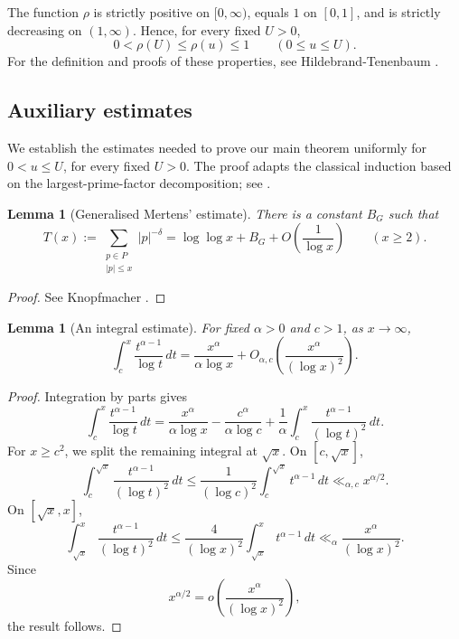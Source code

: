 \documentclass[a4paper]{amsart}
\newtheorem{lemma}[theorem]{Lemma}
\begin{document}
The function $\rho$ is strictly positive on $[0,\infty)$,
equals $1$ on $[0,1]$, and is strictly decreasing on
$(1,\infty)$. Hence, for every fixed $U>0$,
\[0<\rho(U)\le\rho(u)\le1
\qquad(0\le u\le U).\]
For the definition and proofs of these properties, see
Hildebrand-Tenenbaum
\cite[equations (1.5)-(1.6), p. 414,
and Lemma 2.5, p. 426]{hildebrand1993integers}.


\subsection{Auxiliary estimates}

We establish the estimates needed to prove our main theorem
uniformly for $0<u\le U$, for every fixed $U>0$.
The proof adapts the classical induction based on the
largest-prime-factor decomposition; see
\cite[Section 1, p. 416]{hildebrand1993integers}.


\begin{lemma}[Generalised Mertens' estimate]\label{lem:mertens}
There is a constant $B_G$ such that
\[
T(x):=\sum_{\substack{p\in P\\|p|\le x}}|p|^{-\delta}
=
\log\log x+B_G
+O\!\left(\frac1{\log x}\right)
\qquad(x\ge2).
\]
\end{lemma}

\begin{proof}
See Knopfmacher
\cite[Chapter VI, Lemma 2.5]{knopfmacher2015abstract}.
\end{proof}

\begin{lemma}[An integral estimate]\label{lem:integral}
For fixed $\alpha>0$ and $c>1$, as $x\to\infty$,
\[
\int_c^x\frac{t^{\alpha-1}}{\log t}\,dt
=
\frac{x^\alpha}{\alpha\log x}
+
O_{\alpha,c}\!\left(
\frac{x^\alpha}{(\log x)^2}
\right).
\]
\end{lemma}

\begin{proof}
Integration by parts gives
\[
\int_c^x\frac{t^{\alpha-1}}{\log t}\,dt
=
\frac{x^\alpha}{\alpha\log x}
-\frac{c^\alpha}{\alpha\log c}
+\frac1\alpha
\int_c^x\frac{t^{\alpha-1}}{(\log t)^2}\,dt.
\]
For $x\ge c^2$, we split the remaining integral at $\sqrt{x}$.
On $[c,\sqrt{x}]$,
\[
\int_c^{\sqrt{x}}
\frac{t^{\alpha-1}}{(\log t)^2}\,dt
\le
\frac1{(\log c)^2}
\int_c^{\sqrt{x}}t^{\alpha-1}\,dt
\ll_{\alpha,c}x^{\alpha/2}.
\]
On $[\sqrt{x},x]$,
\[
\int_{\sqrt{x}}^x
\frac{t^{\alpha-1}}{(\log t)^2}\,dt
\le
\frac4{(\log x)^2}
\int_{\sqrt{x}}^x t^{\alpha-1}\,dt
\ll_\alpha\frac{x^\alpha}{(\log x)^2}.
\]
Since
\[
x^{\alpha/2}
=o\!\left(\frac{x^\alpha}{(\log x)^2}\right),
\]
the result follows.
\end{proof}
\end{document}
